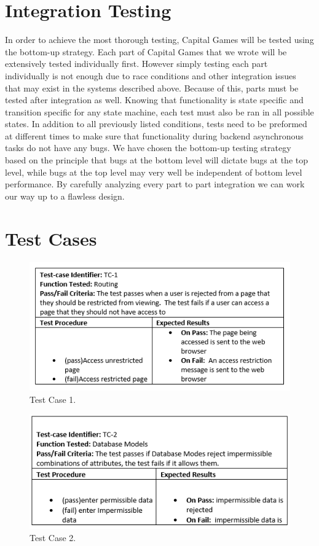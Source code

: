 \section{Integration Testing}

In order to achieve the most thorough testing, Capital Games will be 
tested using the bottom-up strategy. Each part of Capital Games that 
we wrote will be extensively tested individually first. However 
simply testing each part individually is not enough due to race 
conditions and other integration issues that may exist in the 
systems described above. Because of this, parts must be tested after 
integration as well.  Knowing that functionality is state specific 
and transition specific for any state machine, each test must also be 
ran in all possible states. In addition to all previously listed 
conditions, tests need to be preformed at different times to make sure 
that functionality during backend asynchronous tasks do not have any 
bugs. We have chosen the bottom-up testing strategy based on the 
principle that bugs at the bottom level will dictate bugs at the 
top level, while bugs at the top level may very well be independent 
of bottom level performance. By carefully analyzing every part to part 
integration we can work our way up to a flawless design.

\section{Test Cases}

\begin{figure}[b]
\centering
\includegraphics[width=5in]{./Diagrams/TestCases/tc1.png}
\caption{ Test Case 1.}
\end{figure}

\begin{figure}[b]
\centering
\includegraphics[width=5in]{./Diagrams/TestCases/tc2.png}
\caption{ Test Case 2.}
\end{figure}

